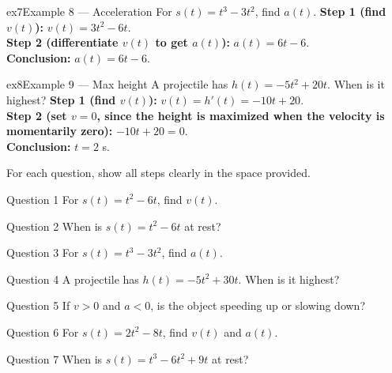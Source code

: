 \documentclass[11pt]{article}
\begin{document}
\begin{example}{ex7}{Example 8 --- Acceleration}
For $s(t)=t^3-3t^2$, find $a(t)$.\soln
\textbf{Step 1 (find $v(t)$):} $v(t)=3t^2-6t$.\\[3pt]
\textbf{Step 2 (differentiate $v(t)$ to get $a(t)$):} $a(t)=6t-6$.\\[3pt]
\textbf{Conclusion:} $a(t)=6t-6$.
\end{example}

\begin{example}{ex8}{Example 9 --- Max height}
A projectile has $h(t)=-5t^2+20t$. When is it highest?\soln
\textbf{Step 1 (find $v(t)$):} $v(t)=h'(t)=-10t+20$.\\[3pt]
\textbf{Step 2 (set $v=0$, since the height is maximized when the velocity is momentarily zero):} $-10t+20=0$.\\[3pt]
\textbf{Conclusion:} $t=2$ s.
\end{example}

\clearpage
{}
For each question, show all steps clearly in the space provided.

\begin{qbox}{Question 1}
For $s(t)=t^2-6t$, find $v(t)$.\workspace{2.4cm}
\end{qbox}

\begin{qbox}{Question 2}
When is $s(t)=t^2-6t$ at rest?\workspace{2.4cm}
\end{qbox}

\begin{qbox}{Question 3}
For $s(t)=t^3-3t^2$, find $a(t)$.\workspace{2.4cm}
\end{qbox}

\begin{qbox}{Question 4}
A projectile has $h(t)=-5t^2+30t$. When is it highest?\workspace{2.4cm}
\end{qbox}

\begin{qbox}{Question 5}
If $v>0$ and $a<0$, is the object speeding up or slowing down?\workspace{2.4cm}
\end{qbox}

\begin{qbox}{Question 6}
For $s(t)=2t^2-8t$, find $v(t)$ and $a(t)$.\workspace{2.4cm}
\end{qbox}

\begin{qbox}{Question 7}
When is $s(t)=t^3-6t^2+9t$ at rest?\workspace{2.4cm}
\end{qbox}
\end{document}
